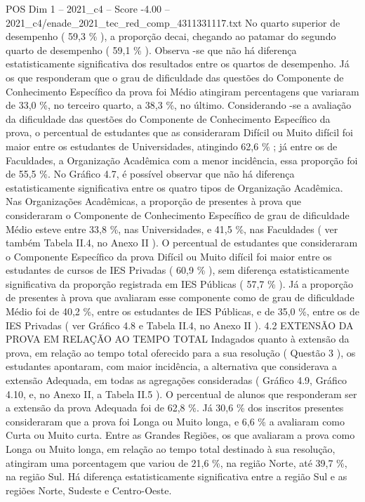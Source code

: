 \begin{textsample}{POS Dim 1 – 2021\_c4 – Score -4.00 – 2021\_c4/enade\_2021\_tec\_red\_comp\_4311331117.txt}
No quarto superior de desempenho ( 59,3 \% ), a proporção decai, chegando ao patamar do segundo quarto de desempenho ( 59,1 \% ).
Observa -se que não há diferença estatisticamente significativa dos resultados entre os quartos de desempenho.
Já os que responderam que o grau de dificuldade das questões do Componente de Conhecimento Específico da prova foi Médio atingiram percentagens que variaram de 33,0 \%, no terceiro quarto, a 38,3 \%, no último.
Considerando -se a avaliação da dificuldade das questões do Componente de Conhecimento Específico da prova, o percentual de estudantes que as consideraram Difícil ou Muito difícil foi maior entre os estudantes de Universidades, atingindo 62,6 \% ; já entre os de Faculdades, a Organização Acadêmica com a menor incidência, essa proporção foi de 55,5 \%.
No Gráfico 4.7, é possível observar que não há diferença estatisticamente significativa entre os quatro tipos de Organização Acadêmica.
Nas Organizações Acadêmicas, a proporção de presentes à prova que consideraram o Componente de Conhecimento Específico de grau de dificuldade Médio esteve entre 33,8 \%, nas Universidades, e 41,5 \%, nas Faculdades ( ver também Tabela II.4, no Anexo II ).
O percentual de estudantes que consideraram o Componente Específico da prova Difícil ou Muito difícil foi maior entre os estudantes de cursos de IES Privadas ( 60,9 \% ), sem diferença estatisticamente significativa da proporção registrada em IES Públicas ( 57,7 \% ).
Já a proporção de presentes à prova que avaliaram esse componente como de grau de dificuldade Médio foi de 40,2 \%, entre os estudantes de IES Públicas, e de 35,0 \%, entre os de IES Privadas ( ver Gráfico 4.8 e Tabela II.4, no Anexo II ). 4.2 EXTENSÃO DA PROVA EM RELAÇÃO AO TEMPO TOTAL Indagados quanto à extensão da prova, em relação ao tempo total oferecido para a sua resolução ( Questão 3 ), os estudantes apontaram, com maior incidência, a alternativa que considerava a extensão Adequada, em todas as agregações consideradas ( Gráfico 4.9, Gráfico 4.10, e, no Anexo II, a Tabela II.5 ).
O percentual de alunos que responderam ser a extensão da prova Adequada foi de 62,8 \%.
Já 30,6 \% dos inscritos presentes consideraram que a prova foi Longa ou Muito longa, e 6,6 \% a avaliaram como Curta ou Muito curta.
Entre as Grandes Regiões, os que avaliaram a prova como Longa ou Muito longa, em relação ao tempo total destinado à sua resolução, atingiram uma porcentagem que variou de 21,6 \%, na região Norte, até 39,7 \%, na região Sul.
Há diferença estatisticamente significativa entre a região Sul e as regiões Norte, Sudeste e Centro-Oeste.

\end{textsample}
